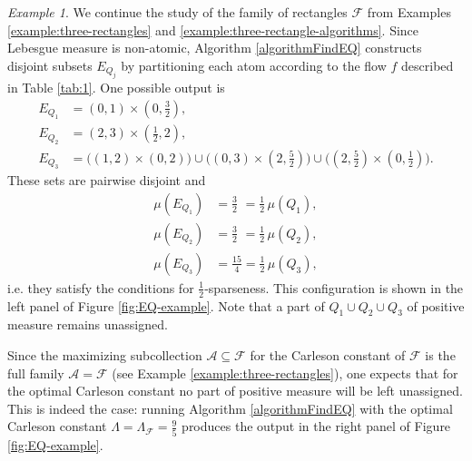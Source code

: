 \documentclass[a4paper, oneside,11pt]{amsart}
\theoremstyle{definition}
\theoremstyle{remark}
\newtheorem{example}[theorem]{Example}
\numberwithin{equation}{section}
\newcommand{\mc}{\mathcal}
\begin{document}
\begin{example}\label{example:three-rectangle-EQ}
We continue the study of the family of rectangles $\mc{F}$ from Examples \ref{example:three-rectangles} and \ref{example:three-rectangle-algorithms}. Since Lebesgue measure is non-atomic, Algorithm \ref{algorithmFindEQ} constructs disjoint subsets $E_{Q_j}$ by partitioning each atom according to the flow $f$ described in Table \ref{tab:1}. One possible output is
\begin{align*}
E_{Q_1} &= (0,1)\times(0,\tfrac32), \\
E_{Q_2} &= (2,3)\times(\tfrac12,2), \\
E_{Q_3}
&= \bigl((1,2)\times(0,2)\bigr) 
\cup \bigl((0,3)\times(2,\tfrac52)\bigr) 
\cup \bigl((2,\tfrac52)\times(0,\tfrac12)\bigr).
\end{align*}
These sets are pairwise disjoint and
\begin{align*}
\mu(E_{Q_1})&=\tfrac32\hspace{4pt} = \tfrac12\,\mu(Q_1),\\
\mu(E_{Q_2})&=\tfrac32\hspace{4pt}= \tfrac12\,\mu(Q_{2}),\\
\mu(E_{Q_3})&=\tfrac{15}{4}= \tfrac12\,\mu(Q_3),
\end{align*}
i.e. they satisfy the conditions for $\frac12$-sparseness. 
This configuration is shown in the left panel of Figure \ref{fig:EQ-example}. Note that a part of $Q_1\cup Q_2\cup Q_3$ of positive measure remains unassigned. 

Since the maximizing subcollection $\mc{A}\subseteq \mc{F}$ for the Carleson constant of $\mc{F}$ is the full family $\mc{A} = \mc F$ (see Example \ref{example:three-rectangles}), one expects that for the optimal Carleson constant no part of positive measure will be left unassigned. This is indeed the case: running Algorithm \ref{algorithmFindEQ} with the optimal Carleson constant $\Lambda=\Lambda_{\mc F}=\tfrac95$  produces the output in the right panel of Figure \ref{fig:EQ-example}.


\end{example}
\end{document}
